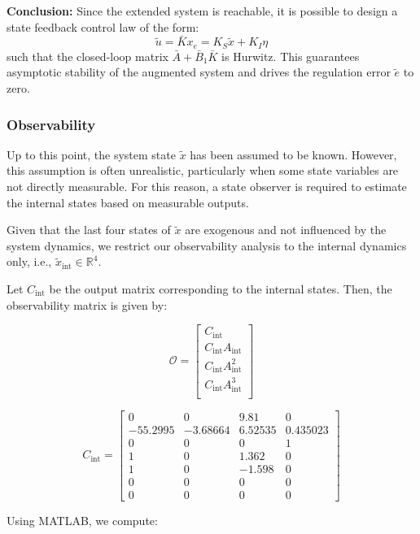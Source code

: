 \documentclass[]{report}
\begin{document}
	\textbf{Conclusion:}  
	Since the extended system is reachable, it is possible to design a state feedback control law of the form:
	\[
	\tilde{u} = \bar{K} x_e = K_S \tilde{x} + K_I \eta
	\]
	such that the closed-loop matrix $\bar{A} + \bar{B}_1 \bar{K}$ is Hurwitz. This guarantees asymptotic stability of the augmented system and drives the regulation error $\tilde{e}$ to zero.
	
	
	
	\subsubsection{Observability}
	
	Up to this point, the system state $\tilde{x}$ has been assumed to be known. However, this assumption is often unrealistic, particularly when some state variables are not directly measurable. For this reason, a state observer is required to estimate the internal states based on measurable outputs.
	
	Given that the last four states of $\tilde{x}$ are exogenous and not influenced by the system dynamics, we restrict our observability analysis to the internal dynamics only, i.e., $\tilde{x}_{\text{int}} \in \mathbb{R}^4$.
	
	Let $C_{\text{int}}$ be the output matrix corresponding to the internal states. Then, the observability matrix is given by:
	
	\[
	\mathcal{O} = \begin{bmatrix}
		C_{\text{int}} \\
		C_{\text{int}} A_{\text{int}} \\
		C_{\text{int}} A_{\text{int}}^2 \\
		C_{\text{int}} A_{\text{int}}^3 \\
	\end{bmatrix}
	\]
	
	\[
	C_{\text{int}} =
	\begin{bmatrix}
		0 & 0 & 9.81 & 0 \\
		-55.2995 & -3.68664 & 6.52535 & 0.435023 \\
		0 & 0 & 0 & 1 \\
		1 & 0 & 1.362 & 0  \\
		1 & 0 & -1.598 & 0 \\
		0 & 0 & 0 & 0 \\
		0 & 0 & 0 & 0 
	\end{bmatrix}
	\]
	
	Using MATLAB, we compute:
	
\end{document}
